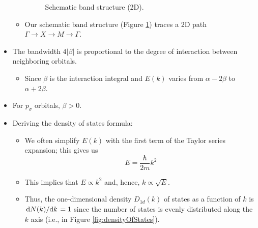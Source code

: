 \documentclass[../notes.tex]{subfiles}
\begin{document}
\begin{itemize}
\begin{itemize}
        \begin{figure}[H]
            \centering
            \caption{Schematic band structure (2D).}
            \label{fig:schematicBands-2D}
        \end{figure}
        \item Our schematic band structure (Figure \ref{fig:schematicBands-2D}) traces a 2D path $\Gamma\to X\to M\to\Gamma$.
    \end{itemize}
    \item {}The bandwidth $4|\beta|$ is proportional to the degree of interaction between neighboring orbitals.
    \begin{itemize}
        \item Since $\beta$ is the interaction integral and $E(k)$ varies from $\alpha-2\beta$ to $\alpha+2\beta$.
    \end{itemize}
    \item For $p_\sigma$ orbitals, $\beta>0$.
    \item Deriving the density of states formula:
    \begin{itemize}
        \item We often simplify $E(k)$ with the first term of the Taylor series expansion; this gives us
        \begin{equation*}
            E = \frac{\hbar}{2m}k^2
        \end{equation*}
        \item This implies that $E\propto k^2$ and, hence, $k\propto\sqrt{E}$.
        \item Thus, the one-dimensional density $D_{1d}(k)$ of states as a function of $k$ is $\dv*{N(k)}{k}=1$ since the number of states is evenly distributed along the $k$ axis (i.e., in Figure \ref{fig:densityOfStates}).

\end{itemize}
\end{itemize}
\end{document}

